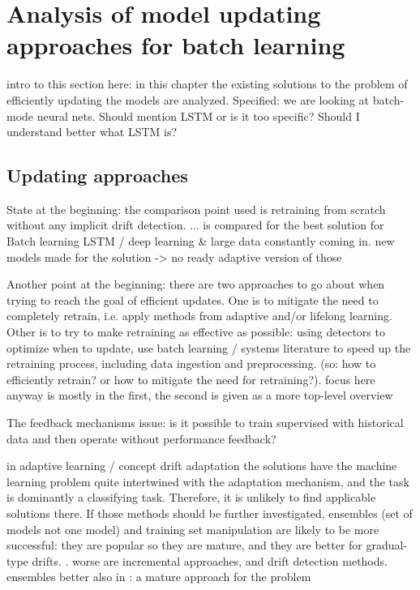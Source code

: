 \chapter{Analysis of model updating approaches for batch learning}


intro to this section here: in this chapter the existing solutions to the problem of efficiently updating the models are analyzed. Specified: we are looking at batch-mode neural nets. Should mention LSTM or is it too specific? Should I understand better what LSTM is?

\section{Updating approaches}

State at the beginning: the comparison point used is retraining from scratch without any implicit drift detection. ... is compared for the best solution for Batch learning LSTM / deep learning
& large data constantly coming in. new models made for the solution -> no ready adaptive version of those

Another point at the beginning: there are two approaches to go about when trying to reach the goal of efficient updates. One is to mitigate the need to completely retrain, i.e. apply methods from adaptive and/or lifelong learning. Other is to try to make retraining as effective as possible: using detectors to optimize when to update, use batch learning / systems literature to speed up the retraining process, including data ingestion and preprocessing. (so: how to efficiently retrain? or how to mitigate the need for retraining?). focus here anyway is mostly in the first, the second is given as a more top-level overview

The feedback mechanisms issue: is it possible to train supervised with historical data and then operate without performance feedback?

in adaptive learning / concept drift adaptation the solutions have the machine learning problem quite intertwined with the adaptation mechanism, and the task is dominantly a classifying task. Therefore, it is unlikely to find applicable solutions there. If those methods should be further investigated, ensembles (set of models not one model) and training set manipulation are likely to be more successful: they are popular so they are mature, and they are better for gradual-type drifts. \cite{zliobaite_driftsurvey}. worse are incremental approaches, and drift detection methods.
ensembles better also in  \cite{mlforstreamingsurvey}:
a mature approach for the problem


